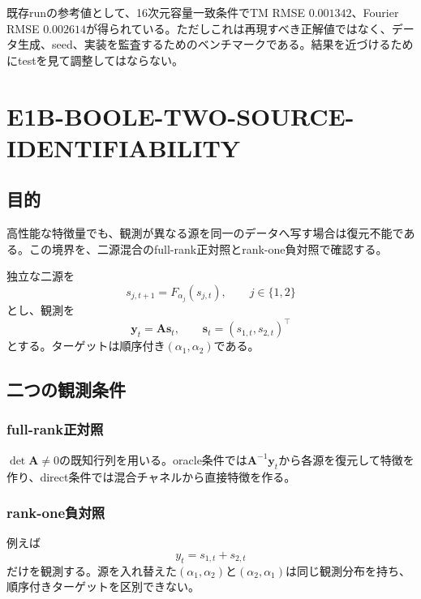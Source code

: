 \documentclass[a4paper,11pt,oneside,openany]{ltjsbook}
\newcommand{\vect}[1]{\bm{#1}}
\newcommand{\mat}[1]{\bm{#1}}
\begin{document}
\begin{reportbox}
既存runの参考値として、16次元容量一致条件でTM RMSE \(0.001342\)、Fourier RMSE \(0.002614\)が得られている。ただしこれは再現すべき正解値ではなく、データ生成、seed、実装を監査するためのベンチマークである。結果を近づけるためにtestを見て調整してはならない。
\end{reportbox}

\section{E1B-BOOLE-TWO-SOURCE-IDENTIFIABILITY}

\subsection{目的}

高性能な特徴量でも、観測が異なる源を同一のデータへ写す場合は復元不能である。この境界を、二源混合のfull-rank正対照とrank-one負対照で確認する。

独立な二源を
\begin{equation}
  s_{j,t+1}=F_{\alpha_j}(s_{j,t}),
  \qquad j\in\{1,2\}
  \label{eq:two_source_dynamics}
\end{equation}
とし、観測を
\begin{equation}
  \vect y_t=\mat A\vect s_t,
  \qquad
  \vect s_t=(s_{1,t},s_{2,t})^\top
  \label{eq:linear_mixing}
\end{equation}
とする。ターゲットは順序付き\((\alpha_1,\alpha_2)\)である。

\subsection{二つの観測条件}

\subsubsection*{full-rank正対照}
\(\det\mat A\neq0\)の既知行列を用いる。oracle条件では\(\mat A^{-1}\vect y_t\)から各源を復元して特徴を作り、direct条件では混合チャネルから直接特徴を作る。

\subsubsection*{rank-one負対照}
例えば
\begin{equation}
  y_t=s_{1,t}+s_{2,t}
  \label{eq:rank_one_observation}
\end{equation}
だけを観測する。源を入れ替えた\((\alpha_1,\alpha_2)\)と\((\alpha_2,\alpha_1)\)は同じ観測分布を持ち、順序付きターゲットを区別できない。
\end{document}
